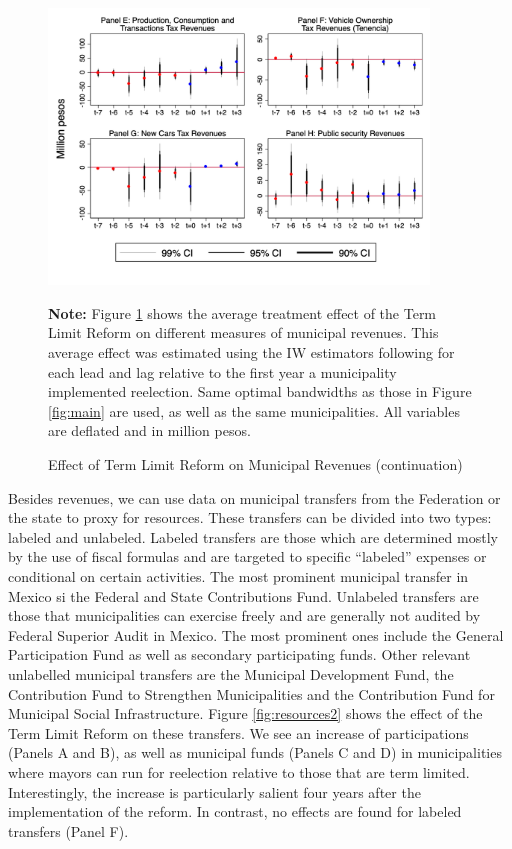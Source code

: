 \documentclass[12pt]{amsart}
\numberwithin{equation}{section}
\theoremstyle{definition}
\theoremstyle{definition}
\theoremstyle{definition}
\begin{document}
\begin{figure}[h]   
\centering
 \caption{Effect of Term Limit Reform on Municipal Revenues (continuation)}
 \label{fig:revenues2}
\includegraphics[width=0.9\textwidth]{../Figures/revenues_allyears2.png}
       \captionsetup{justification=centering}
         
 \textbf{Note:} Figure \ref{fig:revenues2} shows the average treatment effect of the Term Limit Reform on different measures of municipal revenues. This average effect was estimated using the IW estimators following \citet{abraham_sun_2020} for each lead and lag relative to the first year a municipality implemented reelection. Same optimal bandwidths as those in Figure \ref{fig:main} are used, as well as the same municipalities. All variables are deflated and in million pesos.  
          
\end{figure}  

 Besides revenues, we can use data on municipal transfers from the Federation or the state to proxy for resources. These transfers can be divided into two types: labeled and unlabeled. Labeled transfers are those which are determined mostly by the use of fiscal formulas and are targeted to specific ``labeled'' expenses or conditional on certain activities. The most prominent municipal transfer in Mexico si the Federal and State Contributions Fund. Unlabeled transfers are those that municipalities can exercise freely and are generally not audited by Federal Superior Audit in Mexico. The most prominent ones include the General Participation Fund as well as secondary participating funds. Other relevant unlabelled municipal transfers are the Municipal Development Fund, the Contribution Fund to Strengthen Municipalities and the Contribution Fund for Municipal Social Infrastructure. Figure \ref{fig:resources2} shows the effect of the Term Limit Reform on these transfers. We see an increase of participations (Panels A and B), as well as municipal funds (Panels C and D) in municipalities where mayors can run for reelection relative to those that are term limited. Interestingly, the increase is particularly salient four years after the implementation of the reform. In contrast, no effects are found for labeled transfers (Panel F). 
 
\end{document}
